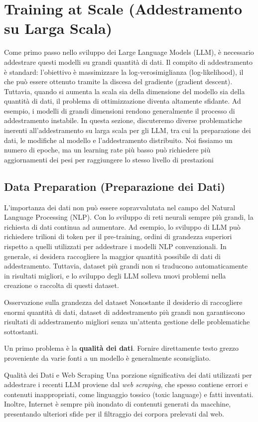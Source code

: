 \section{Training at Scale (Addestramento su Larga Scala)}
Come primo passo nello sviluppo dei Large Language Models (LLM), è necessario addestrare questi modelli su grandi quantità di dati. Il compito di addestramento è standard: l'obiettivo è massimizzare la log-verosimiglianza (log-likelihood), il che può essere ottenuto tramite la discesa del gradiente (gradient descent). Tuttavia, quando si aumenta la scala sia della dimensione del modello sia della quantità di dati, il problema di ottimizzazione diventa altamente sfidante. Ad esempio, i modelli di grandi dimensioni rendono generalmente il processo di addestramento instabile. In questa sezione, discuteremo diverse problematiche inerenti all'addestramento su larga scala per gli LLM, tra cui la preparazione dei dati, le modifiche al modello e l'addestramento distribuito.
Noi fissiamo un numero di epoche, ma un learning rate più basso può richiedere più aggiornamenti dei pesi per raggiungere lo stesso livello di prestazioni

\subsection{Data Preparation (Preparazione dei Dati)}
L'importanza dei dati non può essere sopravvalutata nel campo del Natural Language Processing (NLP). Con lo sviluppo di reti neurali sempre più grandi, la richiesta di dati continua ad aumentare. Ad esempio, lo sviluppo di LLM può richiedere trilioni di token per il pre-training, ordini di grandezza superiori rispetto a quelli utilizzati per addestrare i modelli NLP convenzionali. In generale, si desidera raccogliere la maggior quantità possibile di dati di addestramento. Tuttavia, dataset più grandi non si traducono automaticamente in risultati migliori, e lo sviluppo degli LLM solleva nuovi problemi nella creazione o raccolta di questi dataset.

\begin{observation}{Osservazione sulla grandezza del dataset}
Nonostante il desiderio di raccogliere enormi quantità di dati, dataset di addestramento più grandi non garantiscono risultati di addestramento migliori senza un'attenta gestione delle problematiche sottostanti.
\end{observation}

Un primo problema è la \textbf{qualità dei dati}. Fornire direttamente testo grezzo proveniente da varie fonti a un modello è generalmente sconsigliato.
\begin{definition}{Qualità dei Dati e Web Scraping}
Una porzione significativa dei dati utilizzati per addestrare i recenti LLM proviene dal \textit{web scraping}, che spesso contiene errori e contenuti inappropriati, come linguaggio tossico (toxic language) e fatti inventati. Inoltre, Internet è sempre più inondato di contenuti generati da macchine, presentando ulteriori sfide per il filtraggio dei corpora prelevati dal web.
\end{definition}

